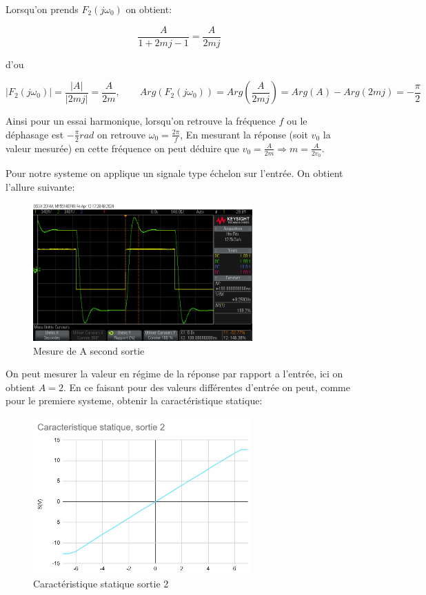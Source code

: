 \documentclass[12pt, a4paper]{report}
\begin{document}
Lorsqu'on prends $F_2(j\omega_0)$ on obtient:

\[
    \frac{A}{1 + 2mj - 1} = \frac{A}{2mj}
\]

d'ou

\[
    |F_2(j\omega_0)| = \frac{|A|}{|2mj|} = \frac{A}{2m}, \quad   \quad Arg(F_2(j\omega_0)) = Arg(\frac{A}{2mj}) = Arg(A) - Arg(2mj) = -\frac{\pi}{2}
\]

Ainsi pour un essai harmonique, lorsqu'on retrouve la fréquence $f$ ou le déphasage est $-\frac{\pi}{2}rad$ on retrouve $\omega_0 = \frac{2\pi}{f}$, 
En mesurant la réponse (soit $v_0$ la valeur mesurée) en cette fréquence on peut déduire que $v_0 = \frac{A}{2m} \Rightarrow m = \frac{A}{2v_0}$.

Pour notre systeme on applique un signale type échelon sur l'entrée. On obtient l'allure suivante:

\begin{figure}[H]
    \centering
    \includegraphics[width=0.75\textwidth]{secondsortiemesureA.png}
    \caption{Mesure de A second sortie}
    \label{fig:mesureA2}
\end{figure}

On peut mesurer la valeur en régime de la réponse par rapport a l'entrée, ici on obtient $A = 2$. En ce faisant pour des
valeurs différentes d'entrée on peut, comme pour le premiere systeme, obtenir la caractéristique statique:

\begin{figure}[H]
    \centering
    \includegraphics[width=0.75\textwidth]{caracteristiquestatiquesys2.png}
    \caption{Caractéristique statique sortie 2}
    \label{fig:carstattiquesys2}
\end{figure}
\end{document}

